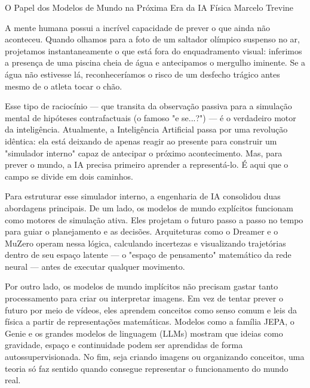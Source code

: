 \hypearticle
{O Papel dos Modelos de Mundo na Próxima Era da IA Física}
{Marcelo Trevine}
{

\subtitle{A Imaginação como Superpoder}

\hspace*{1.5em}A mente humana possui a incrível capacidade de prever o que ainda não aconteceu. Quando olhamos para a foto de um saltador olímpico suspenso no ar, projetamos instantaneamente o que está fora do enquadramento visual: inferimos a presença de uma piscina cheia de água e antecipamos o mergulho iminente. Se a água não estivesse lá, reconheceríamos o risco de um desfecho trágico antes mesmo de o atleta tocar o chão.

\hspace*{1.5em}Esse tipo de raciocínio — que transita da observação passiva para a simulação mental de hipóteses contrafactuais (o famoso "e se...?") — é o verdadeiro motor da inteligência. Atualmente, a Inteligência Artificial passa por uma revolução idêntica: ela está deixando de apenas reagir ao presente para construir um "simulador interno" capaz de antecipar o próximo acontecimento. Mas, para prever o mundo, a IA precisa primeiro aprender a representá-lo. É aqui que o campo se divide em dois caminhos.

\subtitle{Simular vs. Representar}

\hspace*{1.5em}Para estruturar esse simulador interno, a engenharia de IA consolidou duas abordagens principais. De um lado, os modelos de mundo explícitos funcionam como motores de simulação ativa. Eles projetam o futuro passo a passo no tempo para guiar o planejamento e as decisões. Arquiteturas como o Dreamer e o MuZero operam nessa lógica, calculando incertezas e visualizando trajetórias dentro de seu espaço latente — o "espaço de pensamento" matemático da rede neural — antes de executar qualquer movimento.

\hspace*{1.5em}Por outro lado, os modelos de mundo implícitos não precisam gastar tanto processamento para criar ou interpretar imagens. Em vez de tentar prever o futuro por meio de vídeos, eles aprendem conceitos como senso comum e leis da física a partir de representações matemáticas. Modelos como a família JEPA, o Genie e os grandes modelos de linguagem (LLMs) mostram que ideias como gravidade, espaço e continuidade podem ser aprendidas de forma autossupervisionada. No fim, seja criando imagens ou organizando conceitos, uma teoria só faz sentido quando consegue representar o funcionamento do mundo real.

}
